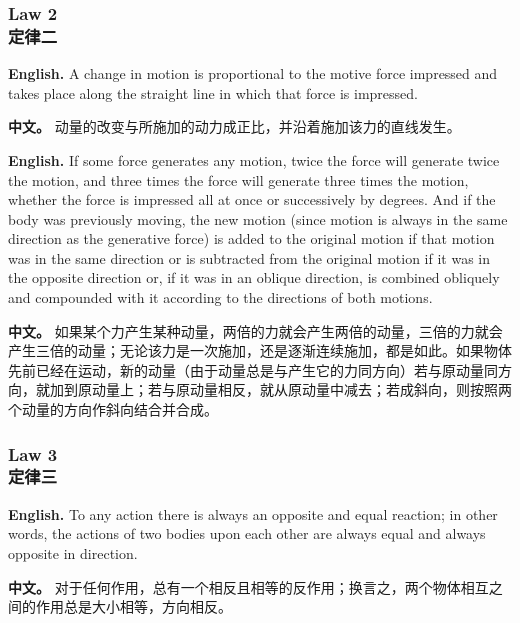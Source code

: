 \subsubsection*{Law 2\\定律二}
\noindent\textbf{English.} A change in motion is proportional to the motive force impressed and takes place along the straight line in which that force is impressed.
\par\noindent\textbf{中文。} 动量的改变与所施加的动力成正比，并沿着施加该力的直线发生。
\medskip

\noindent\textbf{English.} If some force generates any motion, twice the force will generate twice the motion, and three times the force will generate three times the motion, whether the force is impressed all at once or successively by degrees. And if the body was previously moving, the new motion (since motion is always in the same direction as the generative force) is added to the original motion if that motion was in the same direction or is subtracted from the original motion if it was in the opposite direction or, if it was in an oblique direction, is combined obliquely and compounded with it according to the directions of both motions.
\par\noindent\textbf{中文。} 如果某个力产生某种动量，两倍的力就会产生两倍的动量，三倍的力就会产生三倍的动量；无论该力是一次施加，还是逐渐连续施加，都是如此。如果物体先前已经在运动，新的动量（由于动量总是与产生它的力同方向）若与原动量同方向，就加到原动量上；若与原动量相反，就从原动量中减去；若成斜向，则按照两个动量的方向作斜向结合并合成。
\medskip

\subsubsection*{Law 3\\定律三}
\noindent\textbf{English.} To any action there is always an opposite and equal reaction; in other words, the actions of two bodies upon each other are always equal and always opposite in direction.
\par\noindent\textbf{中文。} 对于任何作用，总有一个相反且相等的反作用；换言之，两个物体相互之间的作用总是大小相等，方向相反。
\medskip

